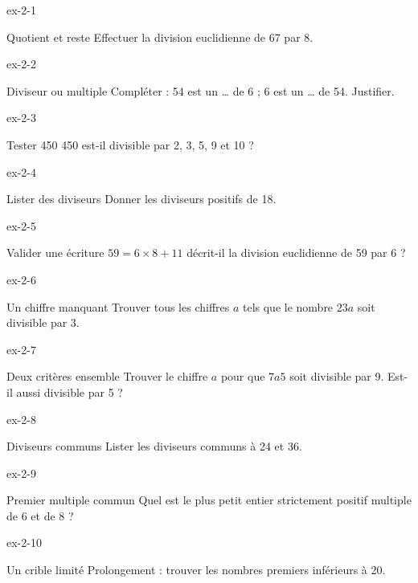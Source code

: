 \clearpage{}
\begin{blocLivre}{ex-2-1}\begin{exercice}[1]{Quotient et reste}
Effectuer la division euclidienne de 67 par 8.
\end{exercice}\end{blocLivre}
\begin{blocLivre}{ex-2-2}\begin{exercice}[1]{Diviseur ou multiple}
Compléter : 54 est un … de 6 ; 6 est un … de 54. Justifier.
\end{exercice}\end{blocLivre}
\begin{blocLivre}{ex-2-3}\begin{exercice}[1]{Tester 450}
450 est-il divisible par 2, 3, 5, 9 et 10 ?
\end{exercice}\end{blocLivre}
\begin{blocLivre}{ex-2-4}\begin{exercice}[1]{Lister des diviseurs}
Donner les diviseurs positifs de 18.
\end{exercice}\end{blocLivre}
\begin{blocLivre}{ex-2-5}\begin{exercice}[1]{Valider une écriture}
$59=6\times8+11$ décrit-il la division euclidienne de 59 par 6 ?
\end{exercice}\end{blocLivre}

\begin{blocLivre}{ex-2-6}\begin{exercice}[2]{Un chiffre manquant}
Trouver tous les chiffres $a$ tels que le nombre $23a$ soit divisible par 3.
\end{exercice}\end{blocLivre}
\begin{blocLivre}{ex-2-7}\begin{exercice}[2]{Deux critères ensemble}
Trouver le chiffre $a$ pour que $7a5$ soit divisible par 9. Est-il aussi divisible par 5 ?
\end{exercice}\end{blocLivre}
\begin{blocLivre}{ex-2-8}\begin{exercice}[2]{Diviseurs communs}
Lister les diviseurs communs à 24 et 36.
\end{exercice}\end{blocLivre}
\begin{blocLivre}{ex-2-9}\begin{exercice}[2]{Premier multiple commun}
Quel est le plus petit entier strictement positif multiple de 6 et de 8 ?
\end{exercice}\end{blocLivre}
\begin{blocLivre}{ex-2-10}\begin{exercice}[2]{Un crible limité}
Prolongement : trouver les nombres premiers inférieurs à 20.
\end{exercice}\end{blocLivre}

